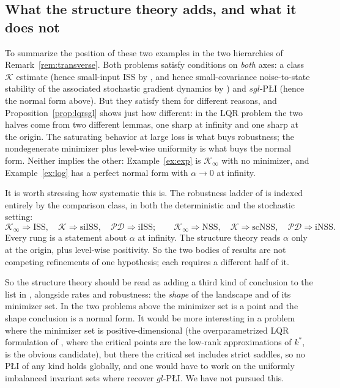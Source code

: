 \documentclass[11pt]{article}
\theoremstyle{plain}
\theoremstyle{definition}
\theoremstyle{remark}
\begin{document}
\subsection{What the structure theory adds, and what it does not}

To summarize the position of these two examples in the two hierarchies of
Remark~\ref{rem:transverse}. Both problems satisfy conditions on \emph{both}
axes: a class $\mathcal{K}$ estimate (hence small-input ISS by
\cite{CuiJiangSontag2024, Sontag2022}, and hence small-covariance noise-to-state
stability of the associated stochastic gradient dynamics by
\cite{CuiJiangSontag2026}) and $sgl$-P\L{}I (hence the normal form above). But
they satisfy them for different reasons, and Proposition~\ref{prop:lqrsgl} shows
just how different: in the LQR problem the two halves come from two different
lemmas, one sharp at infinity and one sharp at the origin. The saturating
behavior at large loss is what buys robustness; the nondegenerate minimizer plus
level-wise uniformity is what buys the normal form. Neither implies the other:
Example~\ref{ex:exp} is $\mathcal{K}_\infty$ with no minimizer, and
Example~\ref{ex:log} has a perfect normal form with $\alpha\to0$ at infinity.

It is worth stressing how systematic this is. The robustness ladder of
\cite{Sontag2025L4DC, CuiJiangSontag2026} is indexed entirely by the comparison
class, in both the deterministic and the stochastic setting:
\[
  \mathcal{K}_\infty \Rightarrow \text{ISS} , \quad
  \mathcal{K} \Rightarrow \text{siISS} , \quad
  \mathcal{PD} \Rightarrow \text{iISS} ;
  \qquad
  \mathcal{K}_\infty \Rightarrow \text{NSS} , \quad
  \mathcal{K} \Rightarrow \text{scNSS} , \quad
  \mathcal{PD} \Rightarrow \text{iNSS} .
\]
Every rung is a statement about $\alpha$ at infinity. The structure theory reads
$\alpha$ only at the origin, plus level-wise positivity. So the two bodies of
results are not competing refinements of one hypothesis; each requires a
different half of it.

So the structure theory should be read as adding a third kind of conclusion to the
list in \cite{Sontag2025L4DC}, alongside rates and robustness: the \emph{shape} of
the landscape and of its minimizer set. In the two problems above the minimizer
set is a point and the shape conclusion is a normal form. It would be more
interesting in a problem where the minimizer set is
positive-dimensional (the
overparametrized LQR formulation of \cite{deOliveiraSiamiSontag2025}, where the
critical points are the low-rank approximations of $k^*$, is the obvious
candidate), but there the critical set includes strict saddles, so no P\L{}I of
any kind holds globally, and one would have to work on the uniformly imbalanced
invariant sets where \cite{Sontag2025L4DC, WafiEtAl} recover $gl$-P\L{}I. We have
not pursued this.
\end{document}

